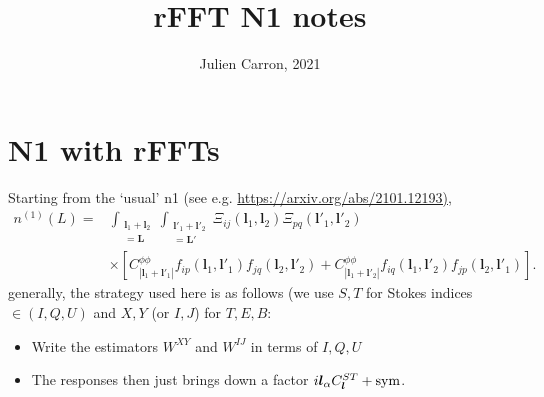 \documentclass[prd, superscriptaddress, tightenlines, longbibliography, nofootinbib, eqsecnum, amsfonts, amsmath, floatfix, onecolumn, notitlepage]{revtex4-2}
\begin{document}
\newcommand{\bl}{\boldsymbol{l}}
\newcommand{\br}{\boldsymbol{r}}
\newcommand{\hn}[0]{{\hat n}}

\newcommand{\bll}{\boldsymbol{L}}
\newcommand{\intL}{\int_{\substack{\bl_1 + \bl_2 \\ =\bll }}}
\newcommand{\intLp}{\int_{\substack{\bl'_1 + \bl'_2 \\ =\bll' }}}

\newcommand{\cred}[1]{\color{red} {#1} \color{black}}
\title{rFFT N1 notes}
\author{Julien Carron, 2021}
\maketitle
\section{N1 with rFFTs}
Starting from the `usual' n1 (see e.g. \url{https://arxiv.org/abs/2101.12193)},
\begin{equation}
\begin{split}
n^{(1)}(L) = &\intL \intLp \Xi_{ij}(\bl_1, \bl_2) \Xi_{pq}(\bl'_1, \bl'_2) \\ &\times\left[ C^{\phi \phi}_{|\bl_1+\bl'_1|}f_{ip}(\bl_1, \bl'_1) f_{jq}(\bl_2, \bl'_2) + C^{\phi \phi}_{|\bl_1+\bl'_2|}f_{iq}(\bl_1, \bl'_2) f_{jp}(\bl_2, \bl'_1) \right].
\end{split}
\end{equation}
generally, the strategy used here is as follows (we use $S,T$ for Stokes indices $\in (I, Q, U)$ and $X, Y$ (or $I, J$) for $T, E, B$:
\begin{itemize}
	\item Write the estimators $W^{XY}$ and $W^{IJ}$ in terms of $I,Q,U$
	\item The responses then just brings down a factor $i \bl_\alpha C^{ST}_{\bl} + \rm{sym}$.
\end{itemize}
\end{document}
